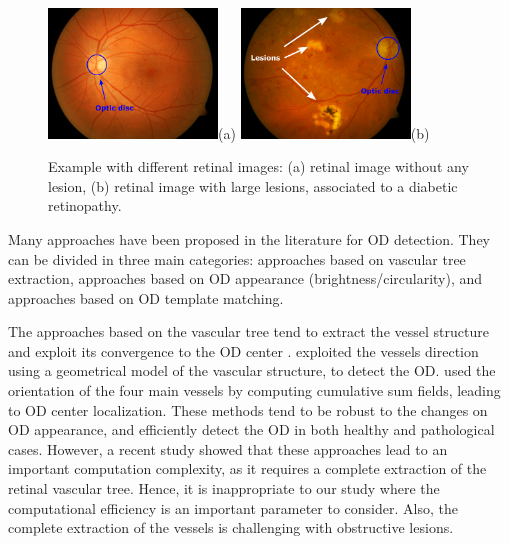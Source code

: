\bigbreak

\begin{figure}[h]
\centering
\includegraphics[width=4.5cm]{Images/Methode/Detection/examples/image006.png}{(a)}
\includegraphics[width=4.5cm]{Images/Methode/Detection/examples/image_lesions.png}{(b)}

\caption{\label{example_lesions}Example with different retinal images: (a) retinal image without any lesion, (b) retinal image with large lesions, associated to a diabetic retinopathy.}
\end{figure}

Many approaches have been proposed in the literature for OD detection. They can be divided in three main categories: approaches based on vascular tree extraction, approaches based on OD appearance (brightness/circularity), and approaches based on OD template matching.

The approaches based on the vascular tree tend to extract the vessel structure and exploit its convergence to the OD center \citep{mahfouz,youssif,zhang}. \citet{foracchia} exploited the vessels direction using a geometrical model of the vascular structure, to detect the OD. \citet{soares} used the orientation of the four main vessels by computing cumulative sum fields, leading to OD center localization. These methods tend to be robust to the changes on OD appearance, and efficiently detect the OD in both healthy and pathological cases. However, a recent study \citep{sayadia2} showed that these approaches lead to an important computation complexity, as it requires a complete extraction of the retinal vascular tree. Hence, it is inappropriate to our study where the computational efficiency is an important parameter to consider. Also, the complete extraction of the vessels is challenging with obstructive lesions. 

